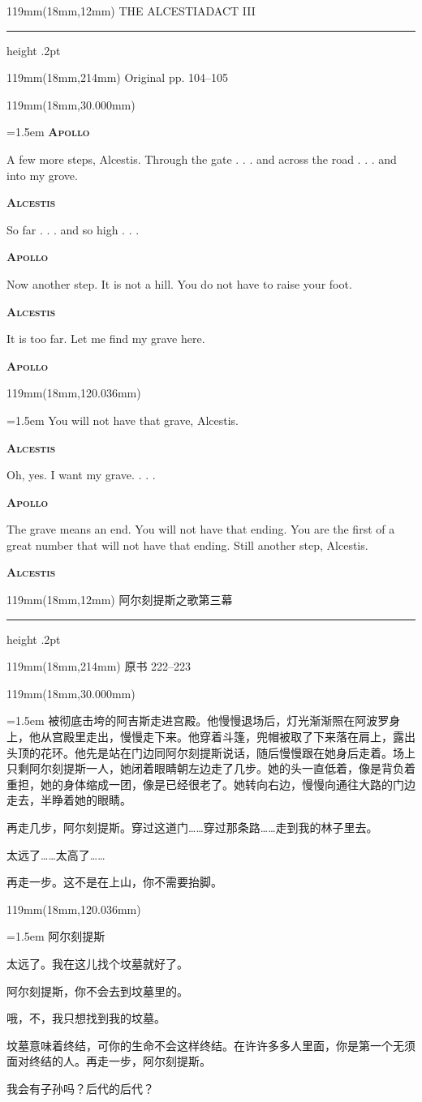 \documentclass{article}
\newcommand{\ENsetup}{\normalfont\color{ink}\fontsize{11}{16.5}\selectfont\emergencystretch=1.5em}
\newcommand{\ZHsetup}{\normalfont\color{ink}\fontsize{10.5}{17}\selectfont\emergencystretch=1.5em}
\newcommand{\ENspeaker}[1]{{\fontsize{9.8}{13}\selectfont\scshape\bfseries #1}\par\vspace{3pt}}
\newcommand{\ZHspeaker}[1]{{\hei\fontsize{10.3}{13}\selectfont #1}\par\vspace{3pt}}
\newcommand{\Block}[3]{\begin{textblock*}{119mm}(18mm,#1mm){#2 #3\par}\end{textblock*}}
\newcommand{\Heading}[3]{%
  \begin{textblock*}{119mm}(18mm,12mm)
    \color{quiet}\fontsize{7.5}{10}\selectfont
    #1\hfill #2\par\vspace{3mm}\hrule height .2pt
  \end{textblock*}
  \begin{textblock*}{119mm}(18mm,214mm)
    \color{quiet}\fontsize{7}{10}\selectfont #3\hfill\thepage
  \end{textblock*}
}
\begin{document}
\newpage
\null
\Heading{THE ALCESTIAD}{ACT III}{Original pp. 104–105}
\Block{30.000}{\ENsetup}{\sloppy
\ENspeaker{Apollo}
A few more steps, Alcestis. Through the gate . . . and across the road . . . and into my grove.\par\vspace{2pt}
\ENspeaker{Alcestis}
So far . . . and so high . . .\par\vspace{2pt}
\ENspeaker{Apollo}
Now another step. It is not a hill. You do not have to raise your foot.\par\vspace{2pt}
\ENspeaker{Alcestis}
It is too far. Let me find my grave here.\par\vspace{2pt}
\ENspeaker{Apollo}}
\Block{120.036}{\ENsetup}{\sloppy
You will not have that grave, Alcestis.\par\vspace{2pt}
\ENspeaker{Alcestis}
Oh, yes. I want my grave. . . .\par\vspace{2pt}
\ENspeaker{Apollo}
The grave means an end. You will not have that ending. You are the first of a great number that will not have that ending. Still another step, Alcestis.\par\vspace{2pt}
\ENspeaker{Alcestis}}
\newpage
\null
\Heading{阿尔刻提斯之歌}{第三幕}{原书 222–223}
\Block{30.000}{\ZHsetup}{\kai 被彻底击垮的阿吉斯走进宫殿。他慢慢退场后，灯光渐渐照在阿波罗身上，他从宫殿里走出，慢慢走下来。他穿着斗篷，兜帽被取了下来落在肩上，露出头顶的花环。他先是站在门边同阿尔刻提斯说话，随后慢慢跟在她身后走着。场上只剩阿尔刻提斯一人，她闭着眼睛朝左边走了几步。她的头一直低着，像是背负着重担，她的身体缩成一团，像是已经很老了。她转向右边，慢慢向通往大路的门边走去，半睁着她的眼睛。\par \vspace{2.2mm}\ZHspeaker{阿波罗}再走几步，阿尔刻提斯。穿过这道门……穿过那条路……走到我的林子里去。\par \vspace{2.2mm}\ZHspeaker{阿尔刻提斯}太远了……太高了……\par \vspace{2.2mm}\ZHspeaker{阿波罗}再走一步。这不是在上山，你不需要抬脚。\par }
\Block{120.036}{\ZHsetup}{\ZHspeaker{阿尔刻提斯}太远了。我在这儿找个坟墓就好了。\par \vspace{2.2mm}\ZHspeaker{阿波罗}阿尔刻提斯，你不会去到坟墓里的。\par \vspace{2.2mm}\ZHspeaker{阿尔刻提斯}哦，不，我只想找到我的坟墓。\par \vspace{2.2mm}\ZHspeaker{阿波罗}坟墓意味着终结，可你的生命不会这样终结。在许许多多人里面，你是第一个无须面对终结的人。再走一步，阿尔刻提斯。\par \vspace{2.2mm}\ZHspeaker{阿尔刻提斯}我会有子孙吗？后代的后代？\par }
\end{document}
